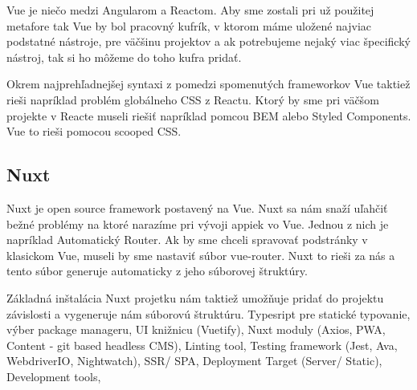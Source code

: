 Vue je niečo medzi Angularom a Reactom. Aby sme zostali pri už použitej metafore tak Vue by bol pracovný kufrík, v ktorom máme uložené najviac podstatné nástroje, pre väčšinu projektov a ak potrebujeme nejaký viac špecifický nástroj, tak si ho môžeme do toho kufra pridať.

Okrem najprehľadnejšej syntaxi z pomedzi spomenutých frameworkov Vue taktiež rieši napríklad problém globálneho CSS z Reactu. Ktorý by sme pri väčšom projekte v Reacte museli riešiť napríklad pomcou BEM alebo Styled Components. Vue to rieši pomocou scooped CSS.

\subsection{Nuxt}
Nuxt je open source framework postavený na Vue. Nuxt sa nám snaží uľahčiť bežné problémy na ktoré narazíme pri vývoji appiek vo Vue. Jednou z nich je napríklad Automatický Router. Ak by sme chceli spravovať podstránky v klasickom Vue, museli by sme nastaviť súbor vue-router. Nuxt to rieši za nás a tento súbor generuje automaticky z jeho súborovej štruktúry. 

Základná inštalácia Nuxt projetku nám taktiež umožňuje pridať do projektu závislosti a vygeneruje nám súborovú štruktúru. Typesript pre statické typovanie, výber package manageru, UI knižnicu (Vuetify), Nuxt moduly (Axios, PWA, Content - git based headless CMS), Linting tool, Testing framework (Jest, Ava, WebdriverIO, Nightwatch), SSR/ SPA, Deployment Target (Server/ Static), Development tools,